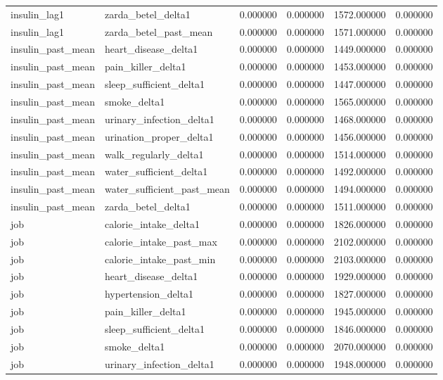 \begin{longtable}{llrrrr}
insulin\_lag1 & zarda\_betel\_delta1 & 0.000000 & 0.000000 & 1572.000000 & 0.000000 \\
insulin\_lag1 & zarda\_betel\_past\_mean & 0.000000 & 0.000000 & 1571.000000 & 0.000000 \\
insulin\_past\_mean & heart\_disease\_delta1 & 0.000000 & 0.000000 & 1449.000000 & 0.000000 \\
insulin\_past\_mean & pain\_killer\_delta1 & 0.000000 & 0.000000 & 1453.000000 & 0.000000 \\
insulin\_past\_mean & sleep\_sufficient\_delta1 & 0.000000 & 0.000000 & 1447.000000 & 0.000000 \\
insulin\_past\_mean & smoke\_delta1 & 0.000000 & 0.000000 & 1565.000000 & 0.000000 \\
insulin\_past\_mean & urinary\_infection\_delta1 & 0.000000 & 0.000000 & 1468.000000 & 0.000000 \\
insulin\_past\_mean & urination\_proper\_delta1 & 0.000000 & 0.000000 & 1456.000000 & 0.000000 \\
insulin\_past\_mean & walk\_regularly\_delta1 & 0.000000 & 0.000000 & 1514.000000 & 0.000000 \\
insulin\_past\_mean & water\_sufficient\_delta1 & 0.000000 & 0.000000 & 1492.000000 & 0.000000 \\
insulin\_past\_mean & water\_sufficient\_past\_mean & 0.000000 & 0.000000 & 1494.000000 & 0.000000 \\
insulin\_past\_mean & zarda\_betel\_delta1 & 0.000000 & 0.000000 & 1511.000000 & 0.000000 \\
job & calorie\_intake\_delta1 & 0.000000 & 0.000000 & 1826.000000 & 0.000000 \\
job & calorie\_intake\_past\_max & 0.000000 & 0.000000 & 2102.000000 & 0.000000 \\
job & calorie\_intake\_past\_min & 0.000000 & 0.000000 & 2103.000000 & 0.000000 \\
job & heart\_disease\_delta1 & 0.000000 & 0.000000 & 1929.000000 & 0.000000 \\
job & hypertension\_delta1 & 0.000000 & 0.000000 & 1827.000000 & 0.000000 \\
job & pain\_killer\_delta1 & 0.000000 & 0.000000 & 1945.000000 & 0.000000 \\
job & sleep\_sufficient\_delta1 & 0.000000 & 0.000000 & 1846.000000 & 0.000000 \\
job & smoke\_delta1 & 0.000000 & 0.000000 & 2070.000000 & 0.000000 \\
job & urinary\_infection\_delta1 & 0.000000 & 0.000000 & 1948.000000 & 0.000000 \\

\end{longtable}
